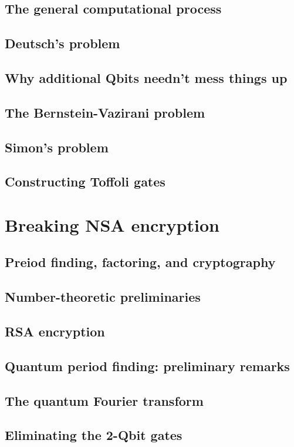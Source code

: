\documentclass{book}
\theoremstyle{definition}
\begin{document}
\subsection{The general computational process}
\subsection{Deutsch's problem}
\subsection{Why additional Qbits needn't mess things up}
\subsection{The Bernstein-Vazirani problem}
\subsection{Simon's problem}
\subsection{Constructing Toffoli gates}


\newpage


\section{Breaking NSA encryption}

\subsection{Preiod finding, factoring, and cryptography}
\subsection{Number-theoretic preliminaries}
\subsection{RSA encryption}
\subsection{Quantum period finding: preliminary remarks}
\subsection{The quantum Fourier transform}
\subsection{Eliminating the 2-Qbit gates}
\end{document}
